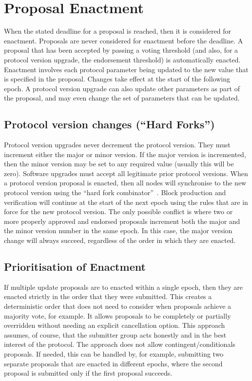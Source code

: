 \newpage
\section{Proposal Enactment}
\label{sect:enactment}

When the stated deadline for a proposal is reached, then it is considered for enactment.  Proposals are never considered for enactment
before the deadline.  A proposal that has been accepted by passing a voting threshold (and also, for a protocol version upgrade, the
endorsement threshold) is automatically enacted.  Enactment involves each protocol parameter being updated to the new value that is specified
in the proposal.  Changes take effect at the start of the following epoch.  A protocol version upgrade can also update other parameters as part of
the proposal, and may even change the set of parameters that can be updated.

\subsection{Protocol version changes (``Hard Forks'')}

Protocol version upgrades never decrement the protocol version.  They must increment either the major or minor version.  If the major version is
incremented, then the minor version may be set to any required value (usually this will be zero).  Software upgrades must accept all legitimate prior protocol versions.
When a protocol version proposal is enacted, then all nodes will synchronise to the new protocol version using the ``hard fork combinator''~\cite{hardfork-combinator}.
Block production and verification will continue at the start of the next epoch using the rules that are in force for the new protocol version.
The only possible conflict is where two or more properly approved and endorsed proposals increment both the major and the minor version number in the same epoch.  In this case, the major version change will always succeed, regardless of the order in which they are enacted.

\subsection{Prioritisation of Enactment}

If multiple update proposals are to enacted within a single epoch, then they are enacted strictly in the order that they were submitted.
This creates a deterministic order that does not need to consider when proposals achieve a majority vote, for example.
It allows proposals to be completely or partially overridden without needing an explicit cancellation option.
This approach assumes, of course, that the submitter group acts honestly and in the best interest of the protocol.
The approach does not allow contingent/conditionals proposals.  If needed, this can be handled by, for example, submitting two separate proposals that are enacted
in different epochs, where the second proposal is submitted only if the first proposal succeeds.


